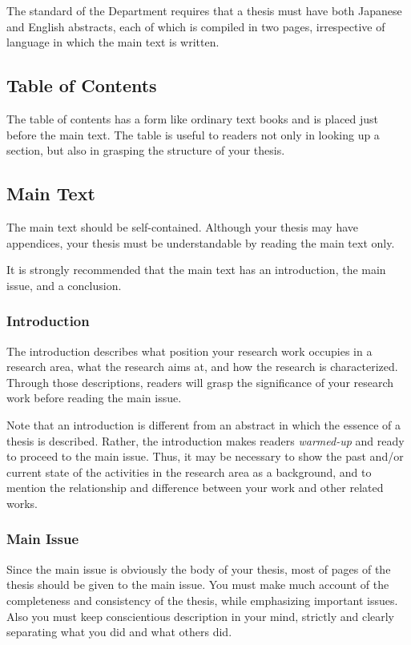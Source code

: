 \documentclass[master,english]{kuisthesis}
\begin{document}
The standard of the Department requires that a thesis must have both
Japanese and English abstracts, each of which is compiled in two pages,
irrespective of language in which the main text is written.

\subsection{Table of Contents}\label{subsec-toc}
The table of contents has a form like ordinary text books and is placed just
before the main text.  The table is useful to readers not only in looking up
a section, but also in grasping the structure of your thesis.

\subsection{Main Text}\label{subsec-main}
The main text should be self-contained.  Although your thesis may have
appendices, your thesis must be understandable by reading the main text
only.

It is strongly recommended that the main text has an introduction, the main
issue, and a conclusion.

\subsubsection{Introduction}\label{subsubsec-intro}
The introduction describes what position your research work occupies in a
research area, what the research aims at, and how the research is
characterized.   Through those descriptions, readers will grasp the
significance of your research work before reading the main issue.

Note that an introduction is different from an abstract in which the essence
of a thesis is described.  Rather, the introduction makes readers {\em
warmed-up} and ready to proceed to the main issue.  Thus, it may be
necessary to show the past and/or current state of the activities in the
research area as a background, and to mention the relationship and
difference between your work and other related works.

\subsubsection{Main Issue}\label{subsubsec-main}
Since the main issue is obviously the body of your thesis, most of pages of
the thesis should be given to the main issue.  You must make much account of
the completeness and consistency of the thesis, while emphasizing important
issues.  Also you must keep conscientious description in your mind, strictly
and clearly separating what you did and what others did.
\end{document}
